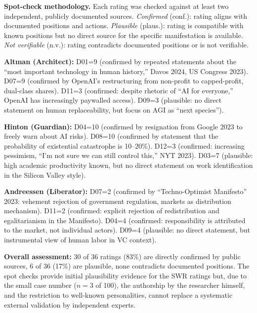 \documentclass[12pt,a4paper]{article}
\begin{document}
\noindent\textbf{Spot-check methodology.} Each rating was checked against at least two independent, publicly documented sources. \emph{Confirmed} (conf.): rating aligns with documented positions and actions. \emph{Plausible} (plaus.): rating is compatible with known positions but no direct source for the specific manifestation is available. \emph{Not verifiable} (n.v.): rating contradicts documented positions or is not verifiable.

\textbf{Altman (Architect):} D01=9 (confirmed by repeated statements about the ``most important technology in human history,'' Davos 2024, US Congress 2023). D07=9 (confirmed by OpenAI's restructuring from non-profit to capped-profit, dual-class shares). D11=3 (confirmed: despite rhetoric of ``AI for everyone,'' OpenAI has increasingly paywalled access). D09=3 (plausible: no direct statement on human replaceability, but focus on AGI as ``next species'').

\textbf{Hinton (Guardian):} D04=10 (confirmed by resignation from Google 2023 to freely warn about AI risks). D08=10 (confirmed by statement that the probability of existential catastrophe is 10--20\%). D12=3 (confirmed: increasing pessimism, ``I'm not sure we can still control this,'' NYT 2023). D03=7 (plausible: high academic productivity known, but no direct statement on work identification in the Silicon Valley style).

\textbf{Andreessen (Liberator):} D07=2 (confirmed by ``Techno-Optimist Manifesto'' 2023: vehement rejection of government regulation, markets as distribution mechanism). D11=2 (confirmed: explicit rejection of redistribution and egalitarianism in the Manifesto). D04=4 (confirmed: responsibility is attributed to the market, not individual actors). D09=4 (plausible: no direct statement, but instrumental view of human labor in VC context).

\textbf{Overall assessment:} 30 of 36 ratings (83\%) are directly confirmed by public sources, 6 of 36 (17\%) are plausible, none contradicts documented positions. The spot checks provide initial plausibility evidence for the SWR ratings but, due to the small case number ($n=3$ of 100), the authorship by the researcher himself, and the restriction to well-known personalities, cannot replace a systematic external validation by independent experts.


\end{document}
